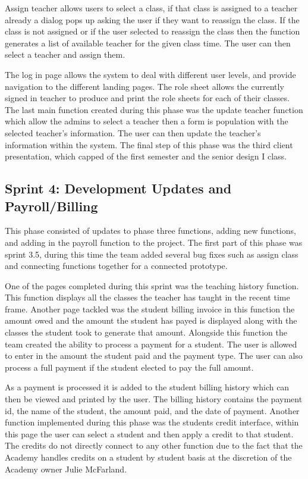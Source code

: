 Assign teacher allows users to select a class, if that class is assigned to a teacher already a dialog pops up asking the user if they want to reassign the class. If the class is not assigned or if the user selected to reassign the class then the function generates a list of available teacher for the given class time. The user can then select a teacher and assign them.

The log in page allows the system to deal with different user levels, and provide navigation to the different landing pages. The role sheet allows the currently signed in teacher to produce and print the role sheets for each of their classes.  The last main function created during this phase was the update teacher function which allow the admins to select a teacher then a form is population with the selected teacher's information. The user can then update the teacher's information within the system. The final step of this phase was the third client presentation, which capped of the first semester and the senior design I class.

\subsection{Sprint 4: Development Updates and Payroll/Billing}
This phase consisted of updates to phase three functions, adding new functions, and adding in the payroll function to the project. The first part of this phase was sprint 3.5, during this time the team added several bug fixes such as assign class and connecting functions together for a connected prototype.

One of the pages completed during this sprint was the teaching history function. This function displays all the classes the teacher has taught in the recent time frame. Another page tackled was the student billing invoice in this function the amount owed and the amount the student has payed is displayed along with the classes the student took to generate that amount. Alongside this function the team created the ability to process a payment for a student. The user is allowed to enter in the amount the student paid and the payment type. The user can also process a full payment if the student elected to pay the full amount.

As a payment is processed it is added to the student billing history which can then be viewed and printed by the user. The billing history contains the payment id, the name of the student, the amount paid, and the date of payment. Another function implemented during this phase was the students credit interface, within this page the user can select a student and then apply a credit to that student. The credits do not directly connect to any other function due to the fact that the Academy handles credits on a student by student basis at the discretion of the Academy owner Julie McFarland.

